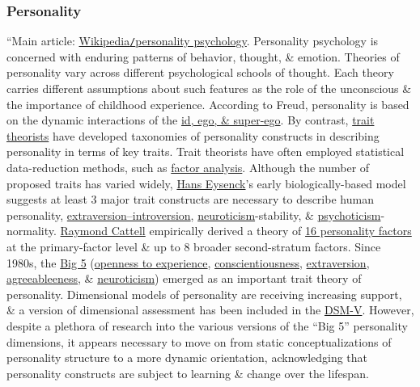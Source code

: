 \documentclass[oneside]{book}
\numberwithin{equation}{section}
\begin{document}
\subsubsection{Personality}
``Main article: \href{https://en.wikipedia.org/wiki/Personality_psychology}{Wikipedia\texttt{/}personality psychology}. Personality psychology is concerned with enduring patterns of behavior, thought, \& emotion. Theories of personality vary across different psychological schools of thought. Each theory carries different assumptions about such features as the role of the unconscious \& the importance of childhood experience. According to Freud, personality is based on the dynamic interactions of the \href{https://en.wikipedia.org/wiki/Id,_ego,_and_super-ego}{id, ego, \& super-ego}. By contrast, \href{https://en.wikipedia.org/wiki/Trait_theorist}{trait theorists} have developed taxonomies of personality constructs in describing personality in terms of key traits. Trait theorists have often employed statistical data-reduction methods, such as \href{https://en.wikipedia.org/wiki/Factor_analysis}{factor analysis}. Although the number of proposed traits has varied widely, \href{https://en.wikipedia.org/wiki/Hans_Eysenck}{Hans Eysenck}'s early biologically-based model suggests at least 3 major trait constructs are necessary to describe human personality, \href{https://en.wikipedia.org/wiki/Extraversion_and_introversion}{extraversion--introversion}, \href{https://en.wikipedia.org/wiki/Neuroticism}{neuroticism}-stability, \& \href{https://en.wikipedia.org/wiki/Psychoticism}{psychoticism}-normality. \href{https://en.wikipedia.org/wiki/Raymond_Cattell}{Raymond Cattell} empirically derived a theory of \href{https://en.wikipedia.org/wiki/16_personality_factors}{16 personality factors} at the primary-factor level \& up to 8 broader second-stratum factors. Since 1980s, the \href{https://en.wikipedia.org/wiki/Big_Five_personality_traits}{Big 5} (\href{https://en.wikipedia.org/wiki/Openness_to_experience}{openness to experience}, \href{https://en.wikipedia.org/wiki/Conscientiousness}{conscientiousness}, \href{https://en.wikipedia.org/wiki/Extraversion_and_introversion}{extraversion}, \href{https://en.wikipedia.org/wiki/Agreeableness}{agreeableeness}, \& \href{https://en.wikipedia.org/wiki/Neuroticism}{neuroticism}) emerged as an important trait theory of personality. Dimensional models of personality are receiving increasing support, \& a version of dimensional assessment has been included in the \href{https://en.wikipedia.org/wiki/DSM-V}{DSM-V}. However, despite a plethora of research into the various versions of the ``Big 5'' personality dimensions, it appears necessary to move on from static conceptualizations of personality structure to a more dynamic orientation, acknowledging that personality constructs are subject to learning \& change over the lifespan.
\end{document}

